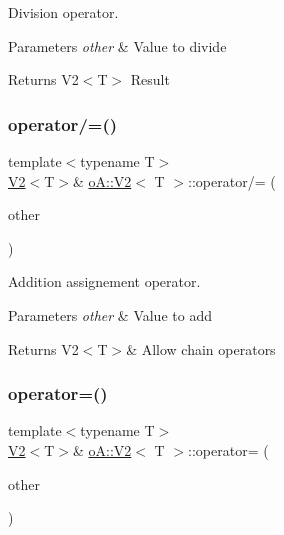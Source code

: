 Division operator. 


\begin{DoxyParams}{Parameters}
{\em other} & Value to divide \\
\hline
\end{DoxyParams}
\begin{DoxyReturn}{Returns}
V2$<$\+T$>$ Result 
\end{DoxyReturn}
\mbox{\label{structo_a_1_1_v2_a9305c1fafa282470c0670119733f346c}} 
\subsubsection{\texorpdfstring{operator/=()}{operator/=()}}
{\footnotesize\ttfamily template$<$typename T$>$ \\
\mbox{\hyperlink{structo_a_1_1_v2}{V2}}$<$T$>$\& \mbox{\hyperlink{structo_a_1_1_v2}{o\+A\+::\+V2}}$<$ T $>$\+::operator/= (\begin{DoxyParamCaption}\item[{const \mbox{\hyperlink{structo_a_1_1_v2}{o\+A\+::\+V2}}$<$ T $>$ \&}]{other }\end{DoxyParamCaption})\hspace{0.3cm}{\ttfamily [inline]}}



Addition assignement operator. 


\begin{DoxyParams}{Parameters}
{\em other} & Value to add \\
\hline
\end{DoxyParams}
\begin{DoxyReturn}{Returns}
V2$<$\+T$>$\& Allow chain operators 
\end{DoxyReturn}
\mbox{\label{structo_a_1_1_v2_ac8fc6159c4258a767540f8af7971348b}} 
\subsubsection{\texorpdfstring{operator=()}{operator=()}\hspace{0.1cm}{\footnotesize\ttfamily [1/2]}}
{\footnotesize\ttfamily template$<$typename T$>$ \\
\mbox{\hyperlink{structo_a_1_1_v2}{V2}}$<$T$>$\& \mbox{\hyperlink{structo_a_1_1_v2}{o\+A\+::\+V2}}$<$ T $>$\+::operator= (\begin{DoxyParamCaption}\item[{\mbox{\hyperlink{structo_a_1_1_v2}{o\+A\+::\+V2}}$<$ T $>$ \&\&}]{other }\end{DoxyParamCaption})\hspace{0.3cm}{\ttfamily [inline]}}



